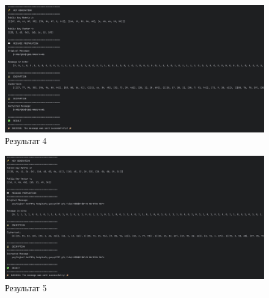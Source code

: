\begin{figure}[h]
    \centering
    \includegraphics[width=\textwidth]{ПРАКТИКА/Images/test_4.png}
    \caption{Результат 4}
\end{figure}

\begin{figure}[h]
    \centering
    \includegraphics[width=\textwidth]{ПРАКТИКА/Images/test_5.png}
    \caption{Результат 5}
\end{figure}